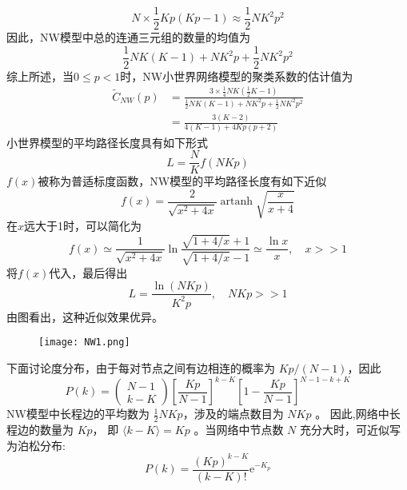 \begin{equation}
    N \times \frac{1}{2} K p(K p-1) \approx \frac{1}{2} N K^2 p^2
\end{equation}
因此，NW模型中总的连通三元组的数量的均值为
\begin{equation}
    \frac{1}{2} N K(K-1)+N K^2 p+\frac{1}{2} N K^2 p^2
\end{equation}
综上所述，当$0 \leqslant p<1$时，NW小世界网络模型的聚类系数的估计值为
\begin{equation}
    \begin{aligned}
    \tilde{C}_{N W}(p) & =\frac{3 \times \frac{1}{4} N K\left(\frac{1}{2} K-1\right)}{\frac{1}{2} N K(K-1)+N K^2 p+\frac{1}{2} N K^2 p^2} \\
    & =\frac{3(K-2)}{4(K-1)+4 K p(p+2)} 
    \end{aligned}
\end{equation}
小世界模型的平均路径长度具有如下形式
\begin{equation}
    L=\frac{N}{K} f(N K p)
\end{equation}
$f(x)$被称为普适标度函数，NW模型的平均路径长度有如下近似
\begin{equation}
    f(x)=\frac{2}{\sqrt{x^2+4 x}} \operatorname{artanh} \sqrt{\frac{x}{x+4}}
\end{equation}
在$x$远大于1时，可以简化为
\begin{equation}
    f(x) \simeq \frac{1}{\sqrt{x^2+4 x}} \ln \frac{\sqrt{1+4 / x}+1}{\sqrt{1+4 / x}-1} \simeq \frac{\ln x}{x},\quad x>>1
\end{equation}
将$f(x)$代入，最后得出
\begin{equation}
    L=\frac{\ln (N K p)}{K^2 p},\quad N K p>>1
\end{equation}
由图看出，这种近似效果优异。\par
\begin{figure}[!htbp]
    \centering
    \texttt{[image: NW1.png]}
\end{figure}
下面讨论度分布，由于每对节点之间有边相连的概率为 $Kp/(N-1)$，因此
\begin{equation}
    P(k)=\left(\begin{array}{l}
    N-1 \\
    k-K
    \end{array}\right)\left[\frac{K p}{N-1}\right]^{k-K}\left[1-\frac{K p}{N-1}\right]^{N-1-k+K}
\end{equation}
NW模型中长程边的平均数为 $\frac{1}{2} N K p$，涉及的端点数目为 $N K p$ 。
因此,网络中长程边的数量为 $K p$，
即 $\langle k-K\rangle=K p$ 。当网络中节点数 $N$ 充分大时，可近似写为泊松分布:
\begin{equation}
    P(k)=\frac{(K p)^{k-K}}{(k-K) !} \mathrm{e}^{-K_p}
\end{equation}
